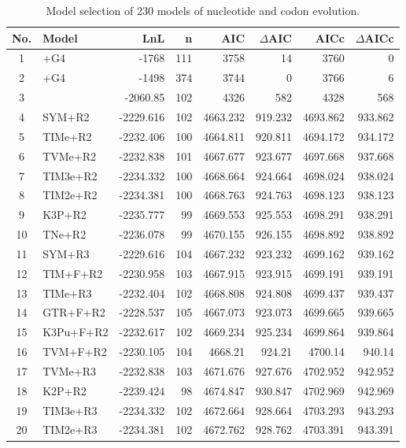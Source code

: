\singlespacing
\begin{longtable}{clrrrrrr}
  \caption{Model selection of 230 models of nucleotide and codon evolution.}\\
  
	No. & Model & LnL & n & AIC & $\Delta$AIC & AICc & $\Delta$AICc \\ \hline
	1 & \selacDMS+G4 & -1768 & 111 & 3758 & 14 & 3760 & 0 \\ 
	2 & \selac+G4 & -1498 & 374 & 3744 & 0 & 3766 & 6 \\ 
	3 & \phydms & -2060.85 & 102 & 4326 & 582 & 4328 & 568 \\ 
	4 & SYM+R2 & -2229.616 & 102 & 4663.232 & 919.232 & 4693.862 & 933.862 \\ 
	5 & TIMe+R2 & -2232.406 & 100 & 4664.811 & 920.811 & 4694.172 & 934.172 \\ 
	6 & TVMe+R2 & -2232.838 & 101 & 4667.677 & 923.677 & 4697.668 & 937.668 \\ 
	7 & TIM3e+R2 & -2234.332 & 100 & 4668.664 & 924.664 & 4698.024 & 938.024 \\ 
	8 & TIM2e+R2 & -2234.381 & 100 & 4668.763 & 924.763 & 4698.123 & 938.123 \\ 
	9 & K3P+R2 & -2235.777 & 99 & 4669.553 & 925.553 & 4698.291 & 938.291 \\ 
	10 & TNe+R2 & -2236.078 & 99 & 4670.155 & 926.155 & 4698.892 & 938.892 \\ 
	11 & SYM+R3 & -2229.616 & 104 & 4667.232 & 923.232 & 4699.162 & 939.162 \\ 
	12 & TIM+F+R2 & -2230.958 & 103 & 4667.915 & 923.915 & 4699.191 & 939.191 \\ 
	13 & TIMe+R3 & -2232.404 & 102 & 4668.808 & 924.808 & 4699.437 & 939.437 \\ 
	14 & GTR+F+R2 & -2228.537 & 105 & 4667.073 & 923.073 & 4699.665 & 939.665 \\ 
	15 & K3Pu+F+R2 & -2232.617 & 102 & 4669.234 & 925.234 & 4699.864 & 939.864 \\ 
	16 & TVM+F+R2 & -2230.105 & 104 & 4668.21 & 924.21 & 4700.14 & 940.14 \\ 
	17 & TVMe+R3 & -2232.838 & 103 & 4671.676 & 927.676 & 4702.952 & 942.952 \\ 
	18 & K2P+R2 & -2239.424 & 98 & 4674.847 & 930.847 & 4702.969 & 942.969 \\ 
	19 & TIM3e+R3 & -2234.332 & 102 & 4672.664 & 928.664 & 4703.293 & 943.293 \\ 
	20 & TIM2e+R3 & -2234.381 & 102 & 4672.762 & 928.762 & 4703.391 & 943.391 \\ 

\end{longtable}
